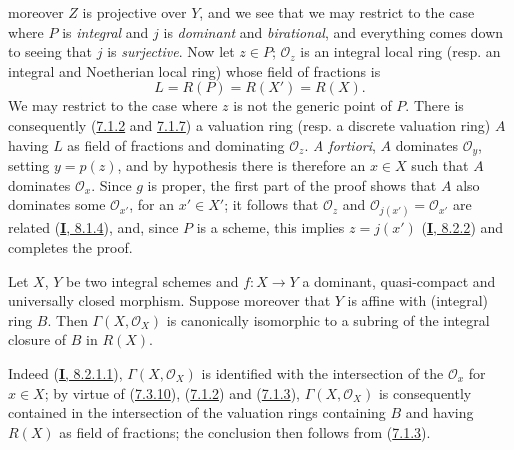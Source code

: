 \begin{enumerate}
moreover $Z$ is projective over $Y$, and we see that we may restrict to the
case where $P$ is \emph{integral} and $j$ is \emph{dominant} and \emph{birational},
and everything comes down to seeing that $j$ is \emph{surjective}. Now let
$z\in P$; $\mathcal{O}_z$ is an integral local ring (resp. an integral and
Noetherian local ring) whose field of fractions is
\[
L=R(P)=R(X')=R(X).
\]
We may restrict to the case where $z$ is not the generic point of $P$.
There is consequently (\hyperref[II.7.1.2]{7.1.2} and
\hyperref[II.7.1.7]{7.1.7}) a valuation ring (resp. a discrete
valuation ring) $A$ having $L$ as field of fractions and dominating
$\mathcal{O}_z$. \emph{A fortiori}, $A$ dominates $\mathcal{O}_y$, setting
$y=p(z)$, and by hypothesis there is therefore an $x\in X$ such that $A$
dominates $\mathcal{O}_x$. Since $g$ is proper, the first part of the proof
shows that $A$ also dominates some $\mathcal{O}_{x'}$, for an $x'\in X'$; it
follows that $\mathcal{O}_z$ and $\mathcal{O}_{j(x')}=\mathcal{O}_{x'}$ are
related (\hyperref[I.8.1.4]{\textbf{I}, 8.1.4}), and, since $P$ is a scheme, this
implies $z=j(x')$ (\hyperref[I.8.2.2]{\textbf{I}, 8.2.2}) and completes the proof.
\end{enumerate}

\begin{corollary}[7.3.11]
\label{II.7.3.11}
Let $X$, $Y$ be two integral schemes and $f:X\to Y$ a dominant,
quasi-compact and universally closed morphism. Suppose moreover that $Y$ is
affine with (integral) ring $B$. Then $\Gamma(X,\mathcal{O}_X)$ is canonically
isomorphic to a subring of the integral closure of $B$ in $R(X)$.
\end{corollary}

Indeed (\hyperref[I.8.2.1.1]{\textbf{I}, 8.2.1.1}),
$\Gamma(X,\mathcal{O}_X)$ is identified with the intersection of the
$\mathcal{O}_x$ for $x\in X$; by virtue of (\hyperref[II.7.3.10]{7.3.10}),
(\hyperref[II.7.1.2]{7.1.2}) and (\hyperref[II.7.1.3]{7.1.3}),
$\Gamma(X,\mathcal{O}_X)$ is consequently contained in the intersection of the
valuation rings containing $B$ and having $R(X)$ as field of fractions;
the conclusion then follows from (\hyperref[II.7.1.3]{7.1.3}).

